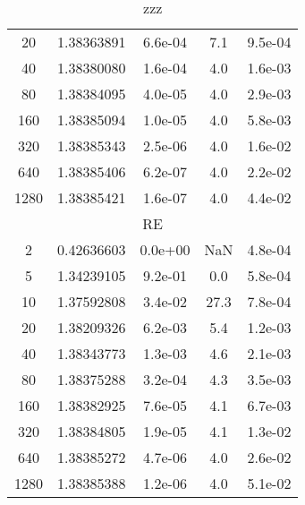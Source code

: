\documentclass[]{rAMF2e}
\begin{document}
{\begin{table}[htp]
\begin{tabular}{|c|c|c|c|c|}
 20 & 1.38363891 & 6.6e-04 & 7.1 & 9.5e-04\\
 40 & 1.38380080 & 1.6e-04 & 4.0 & 1.6e-03\\
 80 & 1.38384095 & 4.0e-05 & 4.0 & 2.9e-03\\
 160 & 1.38385094 & 1.0e-05 & 4.0 & 5.8e-03\\
 320 & 1.38385343 & 2.5e-06 & 4.0 & 1.6e-02\\
 640 & 1.38385406 & 6.2e-07 & 4.0 & 2.2e-02\\
 1280 & 1.38385421 & 1.6e-07 & 4.0 & 4.4e-02\\
\hline \multicolumn{5}{|c|}{RE} \\ \hline
 2 & 0.42636603 & 0.0e+00 & NaN & 4.8e-04\\
 5 & 1.34239105 & 9.2e-01 & 0.0 & 5.8e-04\\
 10 & 1.37592808 & 3.4e-02 & 27.3 & 7.8e-04\\
 20 & 1.38209326 & 6.2e-03 & 5.4 & 1.2e-03\\
 40 & 1.38343773 & 1.3e-03 & 4.6 & 2.1e-03\\
 80 & 1.38375288 & 3.2e-04 & 4.3 & 3.5e-03\\
 160 & 1.38382925 & 7.6e-05 & 4.1 & 6.7e-03\\
 320 & 1.38384805 & 1.9e-05 & 4.1 & 1.3e-02\\
 640 & 1.38385272 & 4.7e-06 & 4.0 & 2.6e-02\\
 1280 & 1.38385388 & 1.2e-06 & 4.0 & 5.1e-02\\
\end{tabular} 
\caption{zzz}
\end{table}
}
\end{document}
